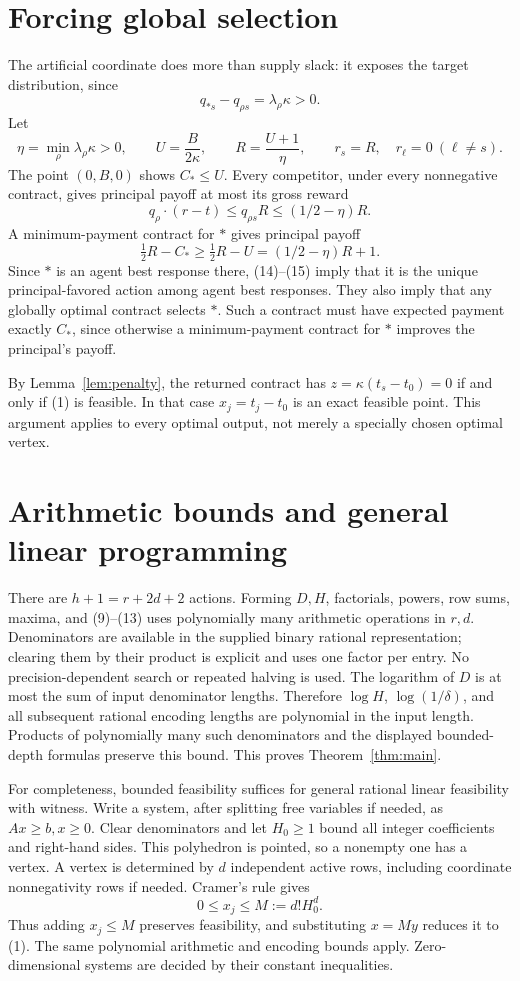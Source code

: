 \documentclass[11pt]{article}
\begin{document}
\section{Forcing global selection}
The artificial coordinate does more than supply slack: it exposes the target
distribution, since
\[
 q_{*s}-q_{\rho s}=\lambda_\rho\kappa>0.
\]
Let
\[
 \eta=\min_\rho\lambda_\rho\kappa>0,\qquad
 U=\frac{B}{2\kappa},\qquad R=\frac{U+1}{\eta},
 \qquad r_s=R,\quad r_\ell=0\ (\ell\ne s).         \tag{13}
\]
The point \((0,B,0)\) shows \(C_*\leq U\).
Every competitor, under every nonnegative contract, gives principal payoff
at most its gross reward
\[
 q_\rho\cdot(r-t)\leq q_{\rho s}R
                  \leq(1/2-\eta)R.                \tag{14}
\]
A minimum-payment contract for \(*\) gives principal payoff
\[
 \tfrac12R-C_*\geq\tfrac12R-U
             =(1/2-\eta)R+1.                       \tag{15}
\]
Since \(*\) is an agent best response there, (14)--(15) imply that it is
the unique principal-favored action among agent best responses. They also
imply that any globally optimal contract selects \(*\). Such a contract
must have expected payment exactly \(C_*\), since otherwise a
minimum-payment contract for \(*\) improves the principal's payoff.

By Lemma~\ref{lem:penalty}, the returned contract has
\(z=\kappa(t_s-t_0)=0\) if and only if (1) is feasible. In that case
\(x_j=t_j-t_0\) is an exact feasible point. This argument applies to
every optimal output, not merely a specially chosen optimal vertex.

\section{Arithmetic bounds and general linear programming}
There are \(h+1=r+2d+2\) actions. Forming \(D,H\), factorials, powers,
row sums, maxima, and (9)--(13) uses polynomially many arithmetic operations
in \(r,d\). Denominators are available in the supplied binary rational
representation; clearing them by their product is explicit and uses one
factor per entry. No precision-dependent search or repeated halving is
used. The logarithm of \(D\) is at most the sum of input denominator
lengths. Therefore \(\log H\), \(\log(1/\delta)\), and all subsequent
rational encoding lengths are polynomial in the input length. Products of
polynomially many such denominators and the displayed bounded-depth
formulas preserve this bound. This proves Theorem~\ref{thm:main}.

For completeness, bounded feasibility suffices for general rational linear
feasibility with witness. Write a system, after splitting free variables if
needed, as \(Ax\geq b,x\geq0\). Clear denominators and let \(H_0\geq1\)
bound all integer coefficients and right-hand sides. This polyhedron is
pointed, so a nonempty one has a vertex. A vertex is determined by \(d\)
independent active rows, including coordinate nonnegativity rows if needed.
Cramer's rule gives
\[
 0\leq x_j\leq M:=d!H_0^d.
\]
Thus adding \(x_j\leq M\) preserves feasibility, and substituting
\(x=My\) reduces it to (1). The same polynomial arithmetic and encoding
bounds apply. Zero-dimensional systems are decided by their constant
inequalities.
\end{document}
